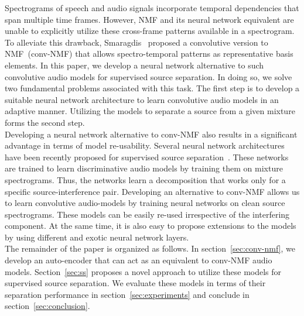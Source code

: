 \documentclass{article}
\begin{document}
Spectrograms of speech and audio signals incorporate temporal dependencies that span multiple time frames. However, NMF and its neural network equivalent are unable to explicitly utilize these cross-frame patterns available in a spectrogram. To alleviate this drawback, Smaragdis~\cite{smaragdis2007convolutive} proposed a convolutive version to NMF~(conv-NMF) that allows spectro-temporal patterns as representative basis elements. In this paper, we develop a neural network alternative to such convolutive audio models for supervised source separation. In doing so, we solve two fundamental problems associated with this task. The first step is to develop a suitable neural network architecture to learn convolutive audio models in an adaptive manner. Utilizing the models to separate a source from a given mixture forms the second step. \\

Developing a neural network alternative to conv-NMF also results in a significant advantage in terms of model re-usability. Several neural network architectures have been recently proposed for supervised source separation~\cite{grais2017single, venkataramani2017end}. These networks are trained to learn discriminative audio models by training them on mixture spectrograms. Thus, the networks learn a decomposition that works only for a specific source-interference pair. Developing an alternative to conv-NMF allows us to learn convolutive audio-models by training neural networks on clean source spectrograms. These models can be easily re-used irrespective of the interfering component. At the same time, it is also easy to propose extensions to the models by using different and exotic neural network layers. \\

The remainder of the paper is organized as follows. In section~\ref{sec:conv-nmf}, we develop an auto-encoder that can act as an equivalent to conv-NMF audio models. Section~\ref{sec:ss} proposes a novel approach to utilize these models for supervised source separation. We evaluate these models in terms of their separation performance in section~\ref{sec:experiments} and conclude in section~\ref{sec:conclusion}. \\
\end{document}
